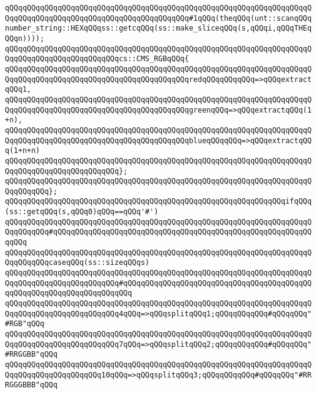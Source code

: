 \verb|qQQqqQQqqQQqqQQqqQQqqQQqqQQqqQQqqQQqqQQqqQQqqQQqqQQqqQQqqQQqqQQqqQQqqQQqqQQqqQQqqQQqqQQqqQQqqQQqqQQqqQQqqQQqqQQq#1qQQq(theqQQq(unt::scanqQQqnumber_string::HEXqQQqss::getcqQQq(ss::make_sliceqQQq(s,qQQqi,qQQqTHEqQQqn))));|\newline
\newline
\verb|qQQqqQQqqQQqqQQqqQQqqQQqqQQqqQQqqQQqqQQqqQQqqQQqqQQqqQQqqQQqqQQqqQQqqQQqqQQqqQQqqQQqqQQqqQQqqQQqcs::CMS_RGBqQQq{|\newline
\verb|qQQqqQQqqQQqqQQqqQQqqQQqqQQqqQQqqQQqqQQqqQQqqQQqqQQqqQQqqQQqqQQqqQQqqQQqqQQqqQQqqQQqqQQqqQQqqQQqqQQqqQQqqQQqqQQqredqQQqqQQqqQQq=>qQQqextractqQQq1,|\newline
\verb|qQQqqQQqqQQqqQQqqQQqqQQqqQQqqQQqqQQqqQQqqQQqqQQqqQQqqQQqqQQqqQQqqQQqqQQqqQQqqQQqqQQqqQQqqQQqqQQqqQQqqQQqqQQqqQQqgreenqQQq=>qQQqextractqQQq(1+n),|\newline
\verb|qQQqqQQqqQQqqQQqqQQqqQQqqQQqqQQqqQQqqQQqqQQqqQQqqQQqqQQqqQQqqQQqqQQqqQQqqQQqqQQqqQQqqQQqqQQqqQQqqQQqqQQqqQQqqQQqblueqQQqqQQq=>qQQqextractqQQq(1+n+n)|\newline
\verb|qQQqqQQqqQQqqQQqqQQqqQQqqQQqqQQqqQQqqQQqqQQqqQQqqQQqqQQqqQQqqQQqqQQqqQQqqQQqqQQqqQQqqQQqqQQqqQQq};|\newline
\verb|qQQqqQQqqQQqqQQqqQQqqQQqqQQqqQQqqQQqqQQqqQQqqQQqqQQqqQQqqQQqqQQqqQQqqQQqqQQqqQQq};|\newline
\newline
\verb|qQQqqQQqqQQqqQQqqQQqqQQqqQQqqQQqqQQqqQQqqQQqqQQqqQQqqQQqqQQqqQQqifqQQq(ss::getqQQq(s,qQQq0)qQQq==qQQq'#')|\newline
\verb|qQQqqQQqqQQqqQQqqQQqqQQqqQQqqQQqqQQqqQQqqQQqqQQqqQQqqQQqqQQqqQQqqQQqqQQqqQQqqQQq#qQQqqQQqqQQqqQQqqQQqqQQqqQQqqQQqqQQqqQQqqQQqqQQqqQQqqQQqqQQqqQQq|\newline
\verb|qQQqqQQqqQQqqQQqqQQqqQQqqQQqqQQqqQQqqQQqqQQqqQQqqQQqqQQqqQQqqQQqqQQqqQQqqQQqqQQqcaseqQQq(ss::sizeqQQqs)|\newline
\verb|qQQqqQQqqQQqqQQqqQQqqQQqqQQqqQQqqQQqqQQqqQQqqQQqqQQqqQQqqQQqqQQqqQQqqQQqqQQqqQQqqQQqqQQqqQQqqQQq#qQQqqQQqqQQqqQQqqQQqqQQqqQQqqQQqqQQqqQQqqQQqqQQqqQQqqQQqqQQqqQQqqQQqqQQq|\newline
\verb|qQQqqQQqqQQqqQQqqQQqqQQqqQQqqQQqqQQqqQQqqQQqqQQqqQQqqQQqqQQqqQQqqQQqqQQqqQQqqQQqqQQqqQQqqQQqqQQq4qQQq=>qQQqsplitqQQq1;qQQqqQQqqQQq#qQQqqQQq"#RGB"qQQq|\newline
\verb|qQQqqQQqqQQqqQQqqQQqqQQqqQQqqQQqqQQqqQQqqQQqqQQqqQQqqQQqqQQqqQQqqQQqqQQqqQQqqQQqqQQqqQQqqQQqqQQq7qQQq=>qQQqsplitqQQq2;qQQqqQQqqQQq#qQQqqQQq"#RRGGBB"qQQq|\newline
\verb|qQQqqQQqqQQqqQQqqQQqqQQqqQQqqQQqqQQqqQQqqQQqqQQqqQQqqQQqqQQqqQQqqQQqqQQqqQQqqQQqqQQqqQQqqQQq10qQQq=>qQQqsplitqQQq3;qQQqqQQqqQQq#qQQqqQQq"#RRRGGGBBB"qQQq|\newline
